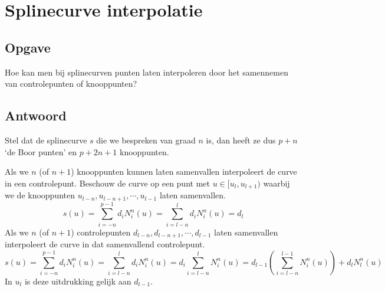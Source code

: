 \documentclass[examenvragen.tex]{subfiles}
\begin{document}
\section{Splinecurve interpolatie}
\subsection{Opgave}
Hoe kan men bij splinecurven punten laten interpoleren door het samennemen van controlepunten of knooppunten?

\subsection{Antwoord}
Stel dat de splinecurve $s$ die we bespreken van graad $n$ is, dan heeft ze dus $p+n$ `de Boor punten' en $p+2n+1$ knooppunten.

Als we $n$ (of $n+1$) knooppunten kunnen laten samenvallen interpoleert de curve in een controlepunt. Beschouw de curve op een punt met $u \in [u_l,u_{l+1})$ waarbij we de knooppunten $u_{l-n},u_{l-n+1},\cdots, u_{l-1}$ laten samenvallen.
\[
s(u)
= \sum_{i=-n}^{p-1}d_iN_{i}^{n}(u)
= \sum_{i=l-n}^{l}d_iN_{i}^{n}(u)
= d_l
\]
Als we $n$ (of $n+1$) controlepunten $d_{l-n},d_{l-n+1},\cdots, d_{l-1}$ laten samenvallen interpoleert de curve in dat samenvallend controlepunt.
\[
s(u)
= \sum_{i=-n}^{p-1}d_iN_{i}^{n}(u)
= \sum_{i=l-n}^{l}d_iN_{i}^{n}(u)
= d_i\sum_{i=l-n}^{l}N_{i}^{n}(u)
= d_{l-1}\left(\sum_{i=l-n}^{l-1}N_{i}^{n}(u)\right) + d_{l}N_{l}^{n}(u)
\]
In $u_l$ is deze uitdrukking gelijk aan $d_{l-1}$.
\end{document}
